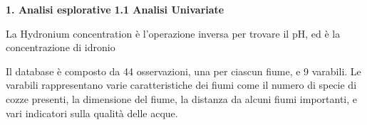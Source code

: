 \documentclass{article} %
\begin{document}
\onehalfspacing


\newpage



\newpage
\begin{flushleft}
    \textbf{\Huge 1. \: Analisi esplorative}
    \vskip 30pt
    \textbf{\Large 1.1 \: Analisi Univariate}
\end{flushleft}
\vskip 10pt

La Hydronium concentration è l'operazione inversa per trovare il pH, ed è la concentrazione di idronio


Il database è composto da 44 osservazioni, una per ciascun fiume, e 9 varabili. Le varabili rappresentano varie caratteristiche dei fiumi come il numero di specie di cozze presenti, la dimensione del fiume, la distanza da alcuni fiumi importanti, e vari indicatori sulla qualità delle acque.\\
\end{document}
